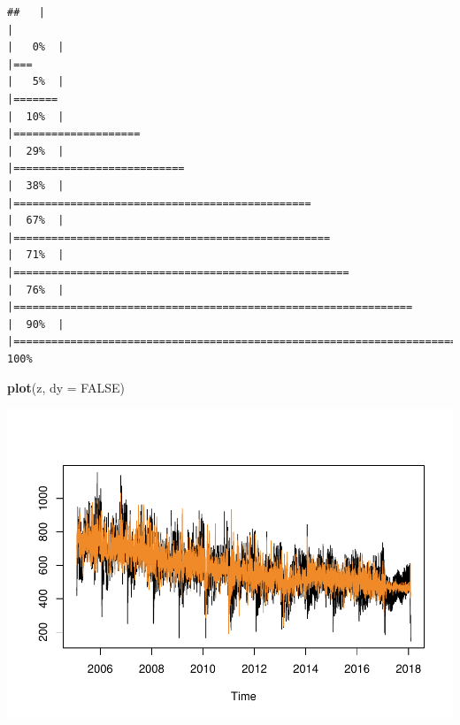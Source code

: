 \documentclass[
]{article}
\newenvironment{Shaded}{\begin{snugshade}}{\end{snugshade}}
\newcommand{\DataTypeTok}[1]{\textcolor[rgb]{0.13,0.29,0.53}{#1}}
\newcommand{\KeywordTok}[1]{\textcolor[rgb]{0.13,0.29,0.53}{\textbf{#1}}}
\newcommand{\NormalTok}[1]{#1}
\newcommand{\OtherTok}[1]{\textcolor[rgb]{0.56,0.35,0.01}{#1}}
\begin{document}
\begin{verbatim}
##   |                                                                              |                                                                      |   0%  |                                                                              |===                                                                   |   5%  |                                                                              |=======                                                               |  10%  |                                                                              |====================                                                  |  29%  |                                                                              |===========================                                           |  38%  |                                                                              |===============================================                       |  67%  |                                                                              |==================================================                    |  71%  |                                                                              |=====================================================                 |  76%  |                                                                              |===============================================================       |  90%  |                                                                              |======================================================================| 100%
\end{verbatim}

\begin{Shaded}
\begin{Highlighting}[]
\KeywordTok{plot}\NormalTok{(z, }\DataTypeTok{dy =} \OtherTok{FALSE}\NormalTok{)}
\end{Highlighting}
\end{Shaded}

\includegraphics{overview_files/figure-latex/dsa-1.pdf}
\end{document}
